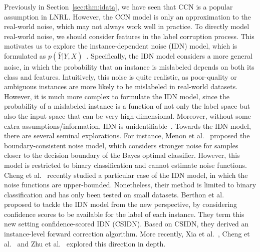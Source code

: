 \label{sec:fu:idlnrl}
Previously in Section~\ref{sec:thm:idata},
we have seen that CCN is a popular assumption in LNRL.
However, the CCN model is only an approximation to the real-world noise, which may not always work well in practice.
To directly model  real-world noise, we should consider  features in the label corruption process. 
This motivates us to explore the instance-dependent noise (IDN) model, which is formulated as $p(\bar{Y}|Y,X)$~. 
Specifically, the IDN model considers a more general noise, in which the probability that an instance is mislabeled depends on both its class and features. Intuitively, this noise is quite realistic, as poor-quality or ambiguous instances are more likely to be mislabeled in real-world datasets. However, it is much more complex to formulate the IDN model, since the probability of a mislabeled instance is a function of not only the label space but also the input space that can be very high-dimensional. Moreover, without some extra assumptions/information, IDN is unidentifiable~.
Towards the IDN model, there are several seminal explorations. For instance, Menon et al.~ proposed the boundary-consistent noise model, which considers stronger noise for samples closer to the decision boundary of the Bayes optimal classifier. However, this model is restricted to binary classification and cannot estimate noise functions. Cheng et al.~ recently studied a particular case of the IDN model, in which the noise functions are upper-bounded. Nonetheless, their method is limited to binary classification and has only been tested on small datasets. Berthon et al.~ proposed to tackle the IDN model from the new perspective, by considering confidence scores to be available for the label of each instance. They term this new setting confidence-scored IDN (CSIDN). Based on CSIDN, they derived an instance-level forward correction algorithm. More recently, Xia et al.~, Cheng et al.~ and Zhu et al.~ explored this direction in depth.

